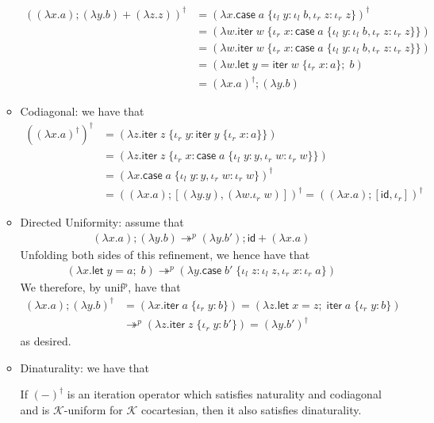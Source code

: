 \documentclass[acmsmall,screen,review]{acmart}
\newcommand{\mc}[1]{\ensuremath{\mathcal{#1}}}
\newcommand{\ms}[1]{\ensuremath{\mathsf{#1}}}
\newcommand{\lto}{:}
\newcommand{\linl}[1]{\iota_l\;{#1}}
\newcommand{\linr}[1]{\iota_r\;{#1}}
\newcommand{\letexpr}[3]{\ensuremath{\ms{let}\;#1 = #2;\;#3}}
\newcommand{\caseexpr}[5]{\ms{case}\;#1\;\{\linl{#2} \lto #3, \linr{#4} \lto #5\}}
\newcommand{\liter}[3]{\ms{iter}\;#1\;\{ \linr{#2} \lto #3 \}}
\newcommand{\cref}{\twoheadrightarrow}
\newcommand{\brle}[1]{{\textsf{#1}}}
\begin{document}
\begin{itemize}
\begin{itemize}
    \begin{align*}
    ((\lambda x.a) ; (\lambda y.b) + (\lambda z.z))^\dagger 
    &= (\lambda x.\caseexpr{a}{y}{\linl{b}}{z}{\linr{z}})^\dagger \\
    &= (\lambda w.\liter{w}{x}{\caseexpr{a}{y}{\linl{b}}{z}{\linr{z}}}) \\
    &= (\lambda w.\liter{w}{x}{\caseexpr{a}{y}{\linl{b}}{z}{\linr{z}}}) \\
    &= (\lambda w.\letexpr{y}{\liter{w}{x}{a}}{b}) \\
    &= (\lambda x.a)^\dagger ; (\lambda y.b)
    \end{align*} 
    \item Codiagonal: we have that
    \begin{align*}
    ((\lambda x.a)^\dagger)^\dagger
    &= (\lambda z.\liter{z}{y}{\liter{y}{x}{a}}) \\
    &= (\lambda z.\liter{z}{x}{\caseexpr{a}{y}{y}{w}{\linr{w}}}) \\
    &= (\lambda x.\caseexpr{a}{y}{y}{w}{\linr{w}})^\dagger \\
    &= ((\lambda x.a) ; [(\lambda y.y), (\lambda w.\linr{w})])^\dagger
      = ((\lambda x.a) ; [\ms{id}, \iota_r])^\dagger
    \end{align*}
    \item Directed Uniformity: assume that
    \begin{align*}
    (\lambda x . a) ; (\lambda y . b) \cref^p (\lambda y . b') ; \ms{id} + (\lambda x . a)
    \end{align*}
    Unfolding both sides of this refinement, we hence have that
    \begin{align*}
    (\lambda x . \letexpr{y}{a}{b}) \cref^p
    (\lambda y . \caseexpr{b'}{z}{\linl{z}}{x}{\linr{a}})
    \end{align*}
    We therefore, by \brle{unif$^p$}, have that
    \begin{align*}
    (\lambda x . a) ; (\lambda y . b)^\dagger 
    &= (\lambda x. \liter{a}{y}{b}) 
     = (\lambda z. \letexpr{x}{z}{\liter{a}{y}{b}})
    \\
    &\cref^p (\lambda z. \liter{z}{y}{b'}) = (\lambda y . b')^\dagger
    \end{align*}
    as desired.
    \item Dinaturality: we have that
    \begin{proposition}
      If $(-)^\dagger$ is an iteration operator which satisfies naturality and codiagonal and is
      $\mc{K}$-uniform for $\mc{K}$ cocartesian, then it also satisfies dinaturality.

\end{proposition}
\end{itemize}
\end{itemize}
\end{document}
